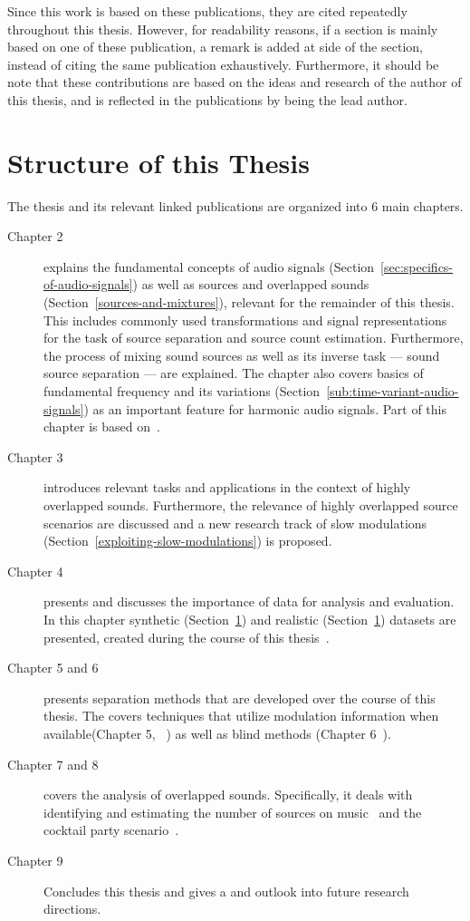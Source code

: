 Since this work is based on these publications, they are cited repeatedly throughout this thesis. However, for readability reasons, if a section is mainly based on one of these publication, a remark is added at side of the section, instead of citing the same publication exhaustively. Furthermore, it should be note that these contributions are based on the ideas and research of the author of this thesis, and is reflected in the publications by being the lead author.

\section{Structure of this Thesis}

The thesis and its relevant linked publications are organized into 6 main chapters.
\begin{description}
  \item[Chapter 2] explains the fundamental concepts of audio signals (Section~\ref{sec:specifics-of-audio-signals}) as well as sources and overlapped sounds (Section~\ref{sources-and-mixtures}), relevant for the remainder of this thesis. 
  This includes commonly used transformations and signal representations for the task of source separation and source count estimation.
  Furthermore, the process of mixing sound sources as well as its inverse task --- sound source separation --- are explained.
  The chapter also covers basics of fundamental frequency and its variations (Section~\ref{sub:time-variant-audio-signals}) as an important feature for harmonic audio signals.
  Part of this chapter is based on~\cite{rafii18}.
  \item[Chapter 3] introduces relevant tasks and applications in the context of highly overlapped sounds.
  Furthermore, the relevance of highly overlapped source scenarios are discussed and a new research track of slow  modulations (Section~\ref{exploiting-slow-modulations}) is proposed.
  \item[Chapter 4] presents and discusses the importance of data for analysis and evaluation.
  In this chapter synthetic (Section~\ref{}) and realistic (Section~\ref{}) datasets are presented, created during the course of this thesis~\cite{oss_wice, oss_unison, oss_libricount, liutkus17}.
  \item[Chapter 5 and 6] presents separation methods that are developed over the course of this thesis. 
  The covers techniques that utilize modulation information when available(Chapter 5, ~\cite{stoeter14, stoeter15acm, stoeter15icassp}) as well as blind methods (Chapter 6~\cite{stoeter16, liutkus17}).
  \item[Chapter 7 and 8] covers the analysis of overlapped sounds. Specifically, it deals with identifying and estimating the number of sources on music~\cite{schoeffler13, stoeter13} and the cocktail party scenario~\cite{stoeter19, stoeter18}.
  \item[Chapter 9] Concludes this thesis and gives a and outlook into future research directions.
\end{description}
